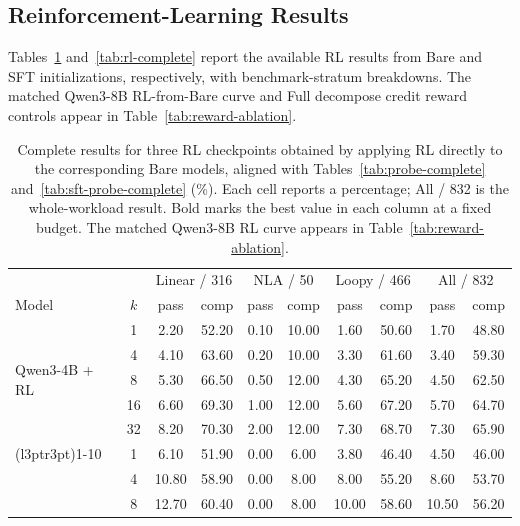 \subsection{Reinforcement-Learning Results}
\label{app:rl-results}

Tables~\ref{tab:rlzero-additional} and~\ref{tab:rl-complete} report the
available RL results from Bare and SFT initializations, respectively, with
benchmark-stratum breakdowns.  The matched Qwen3-8B RL-from-Bare curve and
Full decompose credit reward controls appear in Table~\ref{tab:reward-ablation}.

\begin{table}[H]
\centering
\small
\renewcommand{\arraystretch}{0.86}
\setlength{\tabcolsep}{2.4pt}
\caption{Complete results for three RL checkpoints obtained by applying RL
directly to the corresponding Bare models, aligned with
Tables~\ref{tab:probe-complete} and~\ref{tab:sft-probe-complete} (\%).
Each cell reports a percentage; All / 832 is the whole-workload result.
Bold marks the best value in each column at a fixed budget.  The matched
Qwen3-8B RL curve appears in Table~\ref{tab:reward-ablation}.}
\label{tab:rlzero-additional}
\begin{tabular}{lccccccccc}
\toprule
\rowcolor{algobg}
& & \multicolumn{2}{c}{Linear / 316} & \multicolumn{2}{c}{NLA / 50}
  & \multicolumn{2}{c}{Loopy / 466} & \multicolumn{2}{c}{All / 832} \\
\headercmidrules{\cmidrule(lr){3-4}\cmidrule(lr){5-6}\cmidrule(lr){7-8}\cmidrule(lr){9-10}}
\rowcolor{algobg}
Model & \(k\) & pass & comp & pass & comp & pass & comp & pass & comp \\
\midrule
\multirow{5}{*}{Qwen3-4B + RL}
 & 1  & 2.20 & 52.20 & 0.10 & 10.00 & 1.60 & 50.60 & 1.70 & 48.80 \\
 & 4  & 4.10 & 63.60 & 0.20 & 10.00 & 3.30 & 61.60 & 3.40 & 59.30 \\
 & 8  & 5.30 & 66.50 & 0.50 & 12.00 & 4.30 & 65.20 & 4.50 & 62.50 \\
 & 16 & 6.60 & 69.30 & 1.00 & 12.00 & 5.60 & 67.20 & 5.70 & 64.70 \\
 & 32 & 8.20 & 70.30 & 2.00 & 12.00 & 7.30 & 68.70 & 7.30 & 65.90 \\
\cmidrule(l{3pt}r{3pt}){1-10}
\multirow{5}{*}{Llama 3.1-8B + RL}
 & 1  & 6.10 & 51.90 & 0.00 & 6.00  & 3.80 & 46.40 & 4.50 & 46.00 \\
 & 4  & 10.80 & 58.90 & 0.00 & 8.00  & 8.00 & 55.20 & 8.60 & 53.70 \\
 & 8  & 12.70 & 60.40 & 0.00 & 8.00  & 10.00 & 58.60 & 10.50 & 56.20 \\

\end{tabular}
\end{table}
